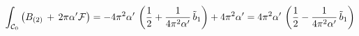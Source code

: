 \begin{equation}
\int_{{\cal C}_0} \left(B_{(2)} \,+\, 2 \pi \alpha'  {\cal F}\right) =
- 4 \pi^2 \alpha'\,\left(\frac{1}{2}  + \frac{1}{4 \pi^2\alpha'}
\,\tilde{b}_1 \right) + 4 \pi^2 \alpha' = 4 \pi^2 \alpha'
\,\left(\frac{1}{2} - \frac{1}{4 \pi^2\alpha'} \, \tilde{b}_1 \right)
\label{for968}
\end{equation}

